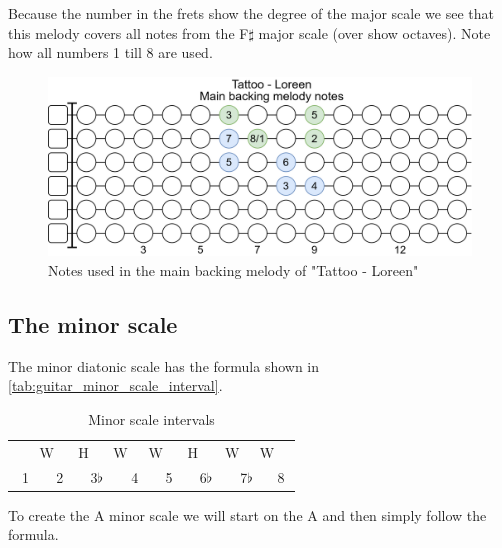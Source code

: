 Because the number in the frets show the degree of the major scale we see that this melody covers all notes from the F$\sharp$ major scale (over show octaves). Note how all numbers 1 till 8 are used.

\begin{figure}[h]
	\centering
	\includegraphics[height=0.2\textheight]{../../Images/NotesUsedInMainBackingMelodyTattooLoreen.png}
	\caption{Notes used in the main backing melody of "Tattoo - Loreen"}
	\label{fig:guitar_tattoo_loreen_main_backing_melody_fretboard_major_scale}
\end{figure}

\newpage

\subsection{The minor scale}

The minor diatonic scale has the formula shown in \autoref{tab:guitar_minor_scale_interval}.

\begin{table}[h]
	\centering
	\begin{tabular}{*{16}{c}}
		& \multicolumn{2}{P{4mm}}{\large{W}} & \multicolumn{2}{P{4mm}}{\large{H}} & \multicolumn{2}{P{4mm}}{\large{W}} & \multicolumn{2}{P{4mm}}{\large{W}} & \multicolumn{2}{P{4mm}}{\large{H}} & \multicolumn{2}{P{4mm}}{\large{W}} & \multicolumn{2}{P{4mm}}{\large{W}} & \\
		\multicolumn{2}{P{4mm}}{1} & \multicolumn{2}{P{4mm}}{2} & \multicolumn{2}{P{4mm}}{3$\flat$} & \multicolumn{2}{P{4mm}}{4} & \multicolumn{2}{P{4mm}}{5} & \multicolumn{2}{P{4mm}}{6$\flat$} & \multicolumn{2}{P{4mm}}{7$\flat$} & \multicolumn{2}{P{4mm}}{8}
	\end{tabular}
	\caption{Minor scale intervals}
	\label{tab:guitar_minor_scale_interval}
\end{table}

To create the A minor scale we will start on the A and then simply follow the formula.

